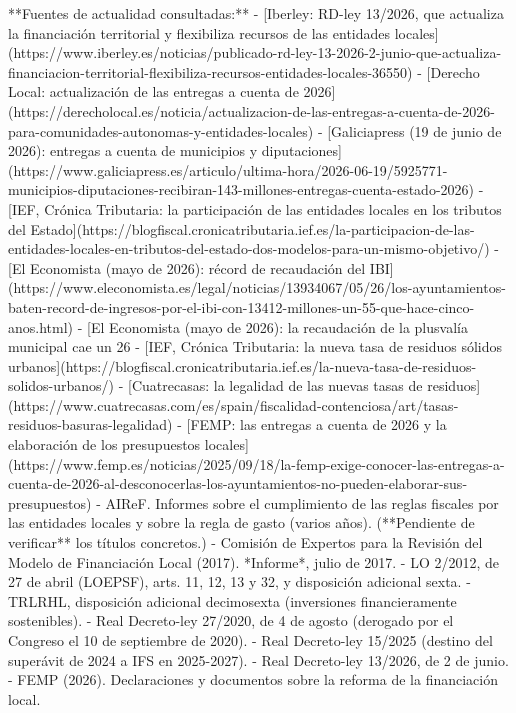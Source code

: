 \documentclass[10pt,a4paper]{article}
\begin{document}
{**Fuentes de actualidad consultadas:**
- [Iberley: RD-ley 13/2026, que actualiza la financiación territorial y flexibiliza recursos de las entidades locales](https://www.iberley.es/noticias/publicado-rd-ley-13-2026-2-junio-que-actualiza-financiacion-territorial-flexibiliza-recursos-entidades-locales-36550)
- [Derecho Local: actualización de las entregas a cuenta de 2026](https://derecholocal.es/noticia/actualizacion-de-las-entregas-a-cuenta-de-2026-para-comunidades-autonomas-y-entidades-locales)
- [Galiciapress (19 de junio de 2026): entregas a cuenta de municipios y diputaciones](https://www.galiciapress.es/articulo/ultima-hora/2026-06-19/5925771-municipios-diputaciones-recibiran-143-millones-entregas-cuenta-estado-2026)
- [IEF, Crónica Tributaria: la participación de las entidades locales en los tributos del Estado](https://blogfiscal.cronicatributaria.ief.es/la-participacion-de-las-entidades-locales-en-tributos-del-estado-dos-modelos-para-un-mismo-objetivo/)
- [El Economista (mayo de 2026): récord de recaudación del IBI](https://www.eleconomista.es/legal/noticias/13934067/05/26/los-ayuntamientos-baten-record-de-ingresos-por-el-ibi-con-13412-millones-un-55-que-hace-cinco-anos.html)
- [El Economista (mayo de 2026): la recaudación de la plusvalía municipal cae un 26%
- [IEF, Crónica Tributaria: la nueva tasa de residuos sólidos urbanos](https://blogfiscal.cronicatributaria.ief.es/la-nueva-tasa-de-residuos-solidos-urbanos/)
- [Cuatrecasas: la legalidad de las nuevas tasas de residuos](https://www.cuatrecasas.com/es/spain/fiscalidad-contenciosa/art/tasas-residuos-basuras-legalidad)
- [FEMP: las entregas a cuenta de 2026 y la elaboración de los presupuestos locales](https://www.femp.es/noticias/2025/09/18/la-femp-exige-conocer-las-entregas-a-cuenta-de-2026-al-desconocerlas-los-ayuntamientos-no-pueden-elaborar-sus-presupuestos)
- AIReF. Informes sobre el cumplimiento de las reglas fiscales por las entidades locales y sobre la regla de gasto (varios años). (**Pendiente de verificar** los títulos concretos.)
- Comisión de Expertos para la Revisión del Modelo de Financiación Local (2017). *Informe*, julio de 2017.
- LO 2/2012, de 27 de abril (LOEPSF), arts. 11, 12, 13 y 32, y disposición adicional sexta.
- TRLRHL, disposición adicional decimosexta (inversiones financieramente sostenibles).
- Real Decreto-ley 27/2020, de 4 de agosto (derogado por el Congreso el 10 de septiembre de 2020).
- Real Decreto-ley 15/2025 (destino del superávit de 2024 a IFS en 2025-2027).
- Real Decreto-ley 13/2026, de 2 de junio.
- FEMP (2026). Declaraciones y documentos sobre la reforma de la financiación local.

}
\end{document}
